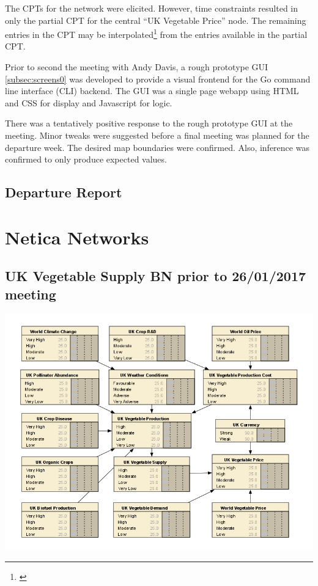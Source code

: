 \documentclass[12pt,notitlepage]{article}
\begin{document}
\begin{multicols*}{2}
The CPTs for the network were elicited. However, time constraints resulted in only the partial CPT for the central ``UK Vegetable Price'' node. The remaining entries in the CPT may be interpolated\footnote{\cite{cain2001}} from the entries available in the partial CPT.

Prior to second the meeting with Andy Davis, a rough prototype GUI \ref{subsec:screens0} was developed to provide a visual frontend for the Go command line interface (CLI) backend. The GUI was a single page webapp using HTML and CSS for display and Javascript for logic.

There was a tentatively positive response to the rough prototype GUI at the meeting. Minor tweaks were suggested before a final meeting was planned for the departure week. The desired map boundaries were confirmed. Also, inference was confirmed to only produce expected values.
\subsection{Departure Report}\label{subsec:departure}
\end{multicols*}

\clearpage
\section{Netica Networks}\label{sec:networks}
\subsection{UK Vegetable Supply BN prior to 26/01/2017 meeting}\label{subsec:network0}
\begin{center}
\includegraphics[width=\linewidth]{network0}
\end{center}
\end{document}
